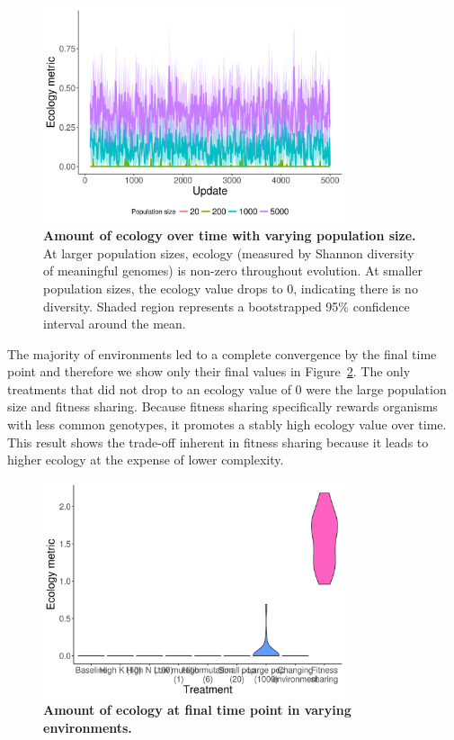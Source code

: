 \documentclass[letterpaper]{article}
\begin{document}
\begin{figure}
\includegraphics[width=3.5in]{figs/ecological_mean_ci_pop_size.png}
\caption{\textbf{Amount of ecology over time with varying population size.} At larger population sizes, ecology (measured by Shannon diversity of meaningful genomes) is non-zero throughout evolution. At smaller population sizes, the ecology value drops to 0, indicating there is no diversity. Shaded region represents a bootstrapped 95\% confidence interval around the mean.}
\label{ecological_time}
\end{figure}

The majority of environments led to a complete convergence by the final time point and therefore we show only their final values in Figure~\ref{ecology}. The only treatments that did not drop to an ecology value of 0 were the large population size and fitness sharing. Because fitness sharing specifically rewards organisms with less common genotypes, it promotes a stably high ecology value over time. This result shows the trade-off inherent in fitness sharing because it leads to higher ecology at the expense of lower complexity.

\begin{figure}
\includegraphics[width=3.5in]{figs/ecologyboxplots.png}
\caption{\textbf{Amount of ecology at final time point in varying environments.} }
\label{ecology}
\end{figure}
\end{document}
